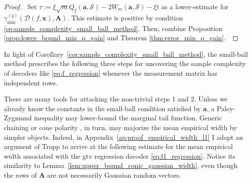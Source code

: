 \begin{proof}
    \pf\ Set $\tau := \xi \sqrt{m} Q_{\xi}(\mathbf{a}, \mathcal{S}) - 2 W_{m}(\mathbf{a}, \mathcal{S}) - \xi t$ as a lower-estimate for $\gamma_{\min}^{(q)} \left ( \mathcal{D}( f, \mathbf{x}), \mathbf{A} \right )$. This estimate is positive by condition \eqref{eq:sample_complexity_small_ball_method}. Then, combine Proposition \ref{prop:lower_bound_min_q_gain} and Theorem \ref{thm:error_min_q_gain}.~\qedsymbol
\end{proof}

In light of Corollary~\ref{cor:sample_complexity_small_ball_method}, the small-ball method prescribes the following three steps for uncovering the sample complexity of decoders like \eqref{eq:f_regression} whenever the measurement matrix has independent rows.
\begin{algorithm}
    \begin{algorithmic}[1]
    \end{algorithmic}
\end{algorithm}

There are many tools for attacking the non-trivial steps 1 and 2. Unless we already know the constants in the small-ball condition satisfied by $\mathbf{a}$, a Paley-Zygmund inequality \cite[Prop. 3.3.1]{delapena1999} may lower-bound the marginal tail function. Generic chaining \cite[Ch. 2]{talagrand2014} or cone polarity \cite[Prop 7.1]{tropp2015a}, in turn, may majorize the mean empirical width by simpler objects. Indeed, in Appendix~\ref{ap:proof_empirical_width_l1} I adapt an argument of Tropp to arrive at the following estimate for the mean empirical width associated with the \acrshort{gtv} regression decoder \eqref{eq:l1_regression}. Notice its similarity to Lemma~\ref{lem:upper_bound_conic_gaussian_width}, even though the rows of $\mathbf{A}$ are not necessarily Gaussian random vectors.

